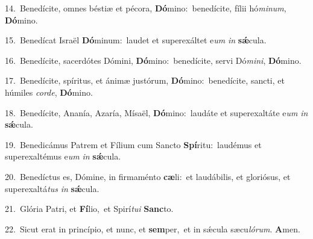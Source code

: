 {\numbfont\textcolor{\numbcolor}{14.}}~Benedícite, omnes béstiæ et pécora, \textbf{Dó}\-mino:~\star benedícite, fílii hó\-\textit{mi}\-\textit{num}, \textbf{Dó}\-mino.\par
{\numbfont\textcolor{\numbcolor}{15.}}~Benedícat Israël \textbf{Dó}\-minum:~\star laudet et superexáltet e\textit{um} \textit{in} \textbf{sǽ}\-cula.\par
{\numbfont\textcolor{\numbcolor}{16.}}~Benedícite, sacerdótes Dómini, \textbf{Dó}\-mino:~\star benedícite, servi Dó\-\textit{mi}\-\textit{ni}, \textbf{Dó}\-mino.\par
{\numbfont\textcolor{\numbcolor}{17.}}~Benedícite, spíritus, et ánimæ justórum, \textbf{Dó}\-mino:~\star benedícite, sancti, et húmiles \textit{cor}\-\textit{de}, \textbf{Dó}\-mino.\par
{\numbfont\textcolor{\numbcolor}{18.}}~Benedícite, Ananía, Azaría, Mísaël, \textbf{Dó}\-mino:~\star laudáte et superexaltáte e\textit{um} \textit{in} \textbf{sǽ}\-cula.\par
{\numbfont\textcolor{\numbcolor}{19.}}~Benedicámus Patrem et Fílium cum Sancto \textbf{Spí}\-ritu:~\star laudémus et superexaltémus e\textit{um} \textit{in} \textbf{sǽ}\-cula.\par
{\numbfont\textcolor{\numbcolor}{20.}}~Benedíctus es, Dómine, in firmaménto \textbf{cæ}\-li:~\star et laudábilis, et gloriósus, et superexaltá\textit{tus} \textit{in} \textbf{sǽ}\-cula.\par
{\numbfont\textcolor{\numbcolor}{21.}}~Glória Patri, et \textbf{Fí}\-lio,~\star et Spirí\-\textit{tu}\-\textit{i} \textbf{Sanc}\-to.\par
{\numbfont\textcolor{\numbcolor}{22.}}~Sicut erat in princípio, et nunc, et \textbf{sem}\-per,~\star et in sǽcula sæcu\-\textit{ló}\-\textit{rum}. \textbf{A}\-men.\par
